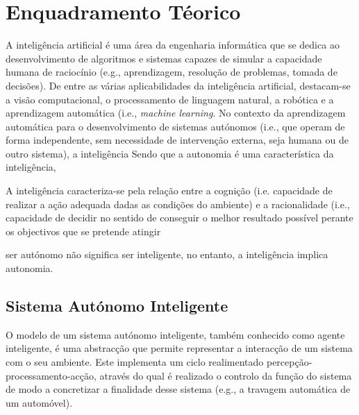 \chapter{Enquadramento Téorico}\label{ch:enquadramento}

A inteligência artificial é uma área da engenharia informática que se dedica ao desenvolvimento de algoritmos e sistemas capazes de simular a capacidade humana de raciocínio (e.g., aprendizagem, resolução de problemas, tomada de decisões).
De entre as várias aplicabilidades da inteligência artificial, destacam-se a visão computacional, o processamento de linguagem natural, a robótica e a aprendizagem automática (i.e., \textit{machine learning}.
No contexto da aprendizagem automática para o desenvolvimento de sistemas autónomos (i.e., que operam de forma independente, sem necessidade de intervenção externa, seja humana ou de outro sistema), a inteligência
Sendo que a autonomia é uma característica da inteligência,

A inteligência caracteriza-se pela relação entre a cognição (i.e. capacidade de realizar a ação adequada dadas as condições do ambiente) e a racionalidade (i.e., capacidade de decidir no sentido de conseguir o melhor resultado possível perante os objectivos que se pretende atingir

ser autónomo não significa ser inteligente, no entanto, a inteligência implica autonomia.


\section{Sistema Autónomo Inteligente}
O modelo de um sistema autónomo inteligente, também conhecido como agente inteligente, é uma abstracção que permite representar a interacção de um sistema com o seu ambiente. Este implementa um ciclo realimentado percepção-processamento-acção, através do qual é realizado o controlo da função do sistema de modo a concretizar a finalidade desse sistema (e.g., a travagem automática de um automóvel).

